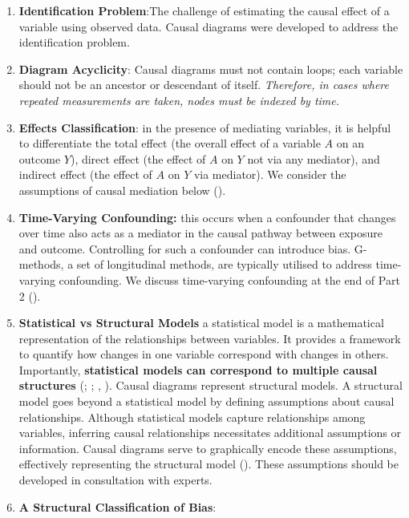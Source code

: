 \documentclass[
  singlecolumn,
  9pt]{article}
\begin{document}
\begin{enumerate}
\def\labelenumi{\arabic{enumi}.}
\setcounter{enumi}{12}
\item
  \textbf{Identification Problem}:The challenge of estimating the causal
  effect of a variable using observed data. Causal diagrams were
  developed to address the identification problem.
\item
  \textbf{Diagram Acyclicity}: Causal diagrams must not contain loops;
  each variable should not be an ancestor or descendant of itself.
  \emph{Therefore, in cases where repeated measurements are taken, nodes
  must be indexed by time.}
\item
  \textbf{Effects Classification}: in the presence of mediating
  variables, it is helpful to differentiate the total effect (the
  overall effect of a variable \(A\) on an outcome \(Y\)), direct effect
  (the effect of \(A\) on \(Y\) not via any mediator), and indirect
  effect (the effect of \(A\) on \(Y\) via mediator). We consider the
  assumptions of causal mediation below
  ().
\item
  \textbf{Time-Varying Confounding:} this occurs when a confounder that
  changes over time also acts as a mediator in the causal pathway
  between exposure and outcome. Controlling for such a confounder can
  introduce bias. G-methods, a set of longitudinal methods, are
  typically utilised to address time-varying confounding. We discuss
  time-varying confounding at the end of Part 2
  ().
\item
  \textbf{Statistical vs Structural Models } a statistical model is a
  mathematical representation of the relationships between variables. It
  provides a framework to quantify how changes in one variable
  correspond with changes in others. Importantly, \textbf{statistical
  models can correspond to multiple causal structures}
  (;
  ;
  ,
  ). Causal diagrams represent structural
  models. A structural model goes beyond a statistical model by defining
  assumptions about causal relationships. Although statistical models
  capture relationships among variables, inferring causal relationships
  necessitates additional assumptions or information. Causal diagrams
  serve to graphically encode these assumptions, effectively
  representing the structural model (). These assumptions should be developed in
  consultation with experts.
\item
  \textbf{A Structural Classification of Bias}:
\end{enumerate}
\end{document}
